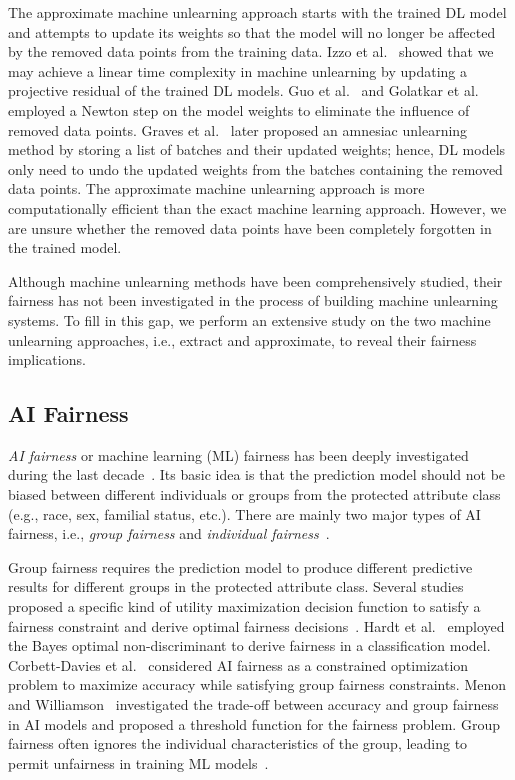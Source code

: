 The approximate machine unlearning approach starts with the trained DL model and attempts to update its weights so that the model will no longer be affected by the removed data points from the training data. 
Izzo et al.~\cite{approximate} showed that we may achieve a linear time complexity in machine unlearning by updating a projective residual of the trained DL models. 
Guo et al.~\cite{certified-removal} and Golatkar et al.~\cite{selective-forgetting} employed a Newton step on the model weights to eliminate the influence of removed data points. 
Graves et al.~\cite{amnesiac} later proposed an amnesiac unlearning method by storing a list of batches and their updated weights; hence, DL models only need to undo the updated weights from the batches containing the removed data points. 
The approximate machine unlearning approach is more computationally efficient than the exact machine learning approach. However, we are unsure whether the removed data points have been completely forgotten in the trained model. 

Although machine unlearning methods have been comprehensively studied, their fairness has not been investigated in the process of building machine unlearning systems. To fill in this gap, we perform an extensive study on the two machine unlearning approaches, i.e., extract and approximate, to reveal their fairness implications. 


\subsection{AI Fairness}

\textit{AI fairness} or machine learning (ML) fairness has been deeply investigated during the last decade~\cite{fairness-re, RE-AI, fairness-survey, fairness-testing, zhang2021ignorance, biswas2020machine, dwork2012fairness}. Its basic idea is that the prediction model should not be biased between different individuals or groups from the protected attribute class (e.g., race, sex, familial status, etc.). There are mainly two major types of AI fairness, i.e., \textit{group fairness} and \textit{individual fairness}~\cite{fairness-survey, dwork2012fairness}. 

Group fairness requires the prediction model to produce different predictive results for different groups in the protected attribute class. Several studies proposed a specific kind of utility maximization decision function to satisfy a fairness constraint and derive optimal fairness decisions~\cite{corbett2017algorithmic, hardt2016equality, menon2018cost, baumann2022enforcing}. Hardt et al.~\cite{hardt2016equality} employed the Bayes optimal non-discriminant to derive fairness in a classification model. Corbett-Davies et al.~\cite{corbett2017algorithmic} considered AI fairness as a constrained optimization problem to maximize accuracy while satisfying group fairness constraints. Menon and Williamson~\cite{menon2018cost} investigated the trade-off between accuracy and group fairness in AI models and proposed a threshold function for the fairness problem. Group fairness often ignores the individual characteristics of the group, leading to permit unfairness in training ML models~\cite{kearns2018preventing}. 

